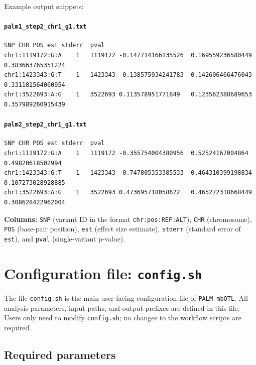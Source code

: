 \documentclass[11pt]{article}
\begin{document}
Example output snippets:

\paragraph{\texttt{palm1\_step2\_chr1\_g1.txt}}
\begin{verbatim}
SNP	CHR	POS	est	stderr	pval
chr1:1119172:G:A	1	1119172	-0.147714166135526	0.169559236580449	0.383663765351224
chr1:1423343:G:T	1	1423343	-0.138575934241783	0.142606466476043	0.331181564060954
chr1:3522693:A:G	1	3522693	0.113578951771849	0.123562388689653	0.357989260915439
\end{verbatim}

\paragraph{\texttt{palm2\_step2\_chr1\_g1.txt}}
\begin{verbatim}
SNP	CHR	POS	est	stderr	pval
chr1:1119172:G:A	1	1119172	-0.355754004380956	0.52524167004864	0.49820618502994
chr1:1423343:G:T	1	1423343	-0.747805353385533	0.464310399198834	0.107273028928885
chr1:3522693:A:G	1	3522693	0.473695718058622	0.465272318668449	0.308628422962004
\end{verbatim}

\noindent\textbf{Columns:}
\texttt{SNP} (variant ID in the format \texttt{chr:pos:REF:ALT}),
\texttt{CHR} (chromosome),
\texttt{POS} (base-pair position),
\texttt{est} (effect size estimate),
\texttt{stderr} (standard error of \texttt{est}),
and \texttt{pval} (single-variant p-value).


\section{Configuration file: \texttt{config.sh}}

The file \texttt{config.sh} is the main user-facing configuration file of \texttt{PALM-mbQTL}.
All analysis parameters, input paths, and output prefixes are defined in this file.
Users only need to modify \texttt{config.sh}; no changes to the workflow scripts are required.

\subsection*{Required parameters}
\end{document}
